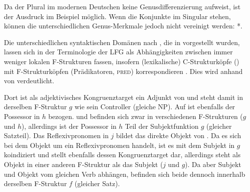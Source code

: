 Da der Plural im modernen Deutschen keine
Genusdifferenzierung aufweist, ist der Ausdruck im Beispiel möglich. Wenn die
Konjunkte im Singular stehen, können die unterschiedlichen Genus-Merkmale
jedoch nicht vereinigt werden: *.

Die unterschiedlichen syntaktischen Domänen nach \citet[54]{corbett2006}, die
in  vorgestellt wurden, lassen sich in der Terminologie
der LFG als Abhängigkeiten zwischen immer weniger lokalen F-Strukturen fassen,
insofern (lexikalische) C-Strukturköpfe () mit F-Strukturköpfen
(Prädikatoren, \textsc{pred}) korrespondieren \autocite[117]{bresnanetal2016}.
Dies wird anhand von  verdeutlicht.

Dort ist  als adjektivisches Kongruenztarget ein Adjunkt von
 und steht damit in derselben F-Struktur $g$ wie sein Controller
(gleiche NP). Auf  ist ebenfalls der Possessor  in $h$
bezogen.  und  befinden sich zwar in verschiedenen
F-Strukturen ($g$ und $h$), allerdings ist der Possessor in $h$ Teil der
Subjektfunktion $g$ (gleicher Satzteil). Das Reflexivpronomen  in $j$
bildet das direkte Objekt von . Da es sich bei dem Objekt um ein
Reflexivpronomen handelt, ist es mit dem Subjekt in $g$ koindiziert und stellt
ebenfalls dessen Kongruenztarget dar, allerdings steht  als Objekt in
einer anderen F-Struktur als das Subjekt ($j$ und $g$). Da aber Subjekt und
Objekt vom gleichen Verb  abhängen, befinden sich beide dennoch
innerhalb derselben F-Struktur $f$ (gleicher Satz).

